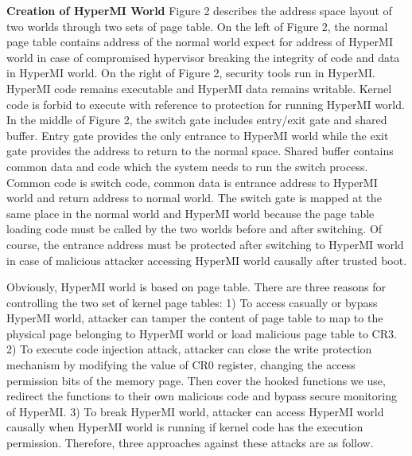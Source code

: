 \documentclass[conference]{IEEEtran}
\begin{document}
\textbf{Creation of HyperMI World}
Figure 2 describes the address space layout of two worlds through two sets of page table. On the left of Figure 2, the normal page table contains address of the normal world expect for address of HyperMI world in case of compromised hypervisor breaking the integrity of code and data in HyperMI world. On the right of Figure 2, security tools run in HyperMI. HyperMI code remains executable and HyperMI data remains writable. Kernel code is forbid to execute with reference to protection for running HyperMI world. In the middle of Figure 2, the switch gate includes entry/exit gate and shared buffer. Entry gate provides the only entrance to HyperMI world while the exit gate provides the address to return to the normal space. Shared buffer contains common data and code which the system needs to run the switch process. Common code is switch code, common data is entrance address to HyperMI world and return address to normal world. The switch gate is mapped at the same place in the normal world and HyperMI world because the page table loading code must be called by the two worlds before and after switching. Of course, the entrance address must be protected after switching to HyperMI world in case of malicious attacker accessing HyperMI world causally after trusted boot. 

Obviously, HyperMI world is based on page table. There are three reasons for controlling the two set of kernel page tables: 1) To access casually or bypass HyperMI world, attacker can tamper the content of page table to map to the physical page belonging to HyperMI world or load malicious page table to CR3. 2) To execute code injection attack, attacker can close the write protection mechanism by modifying the value of CR0 register, changing the access permission bits of the memory page. Then cover the hooked functions we use, redirect the functions to their own malicious code and bypass secure monitoring of HyperMI. 3) To break HyperMI world, attacker can access HyperMI world causally when HyperMI world is running if kernel code has the execution permission. Therefore, three approaches against these attacks are as follow.
\end{document}
